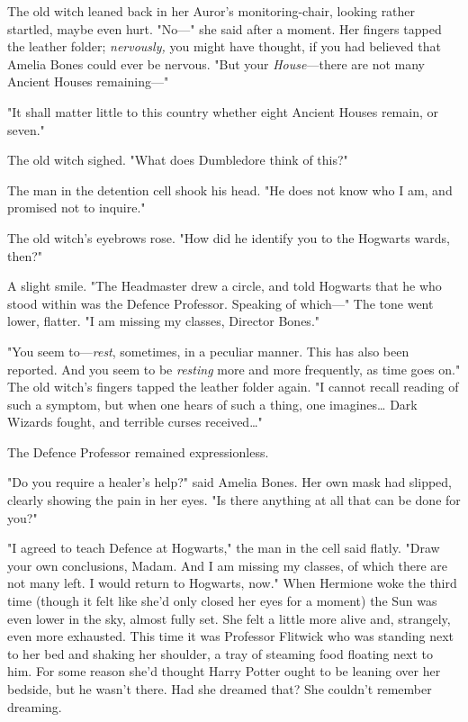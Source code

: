 The old witch leaned back in her Auror's monitoring-chair, looking rather
startled, maybe even hurt. "No---" she said after a moment. Her fingers tapped
the leather folder; \emph{nervously,} you might have thought, if you had
believed that Amelia Bones could ever be nervous. "But your
\emph{House}---there are not many Ancient Houses remaining---"

"It shall matter little to this country whether eight Ancient Houses remain, or
seven."

The old witch sighed. "What does Dumbledore think of this?"

The man in the detention cell shook his head. "He does not know who I am, and
promised not to inquire."

The old witch's eyebrows rose. "How did he identify you to the Hogwarts wards,
then?"

A slight smile. "The Headmaster drew a circle, and told Hogwarts that he who
stood within was the Defence Professor. Speaking of which---" The tone went
lower, flatter. "I am missing my classes, Director Bones."

"You seem to---\emph{rest}, sometimes, in a peculiar manner. This has also been
reported. And you seem to be \emph{resting} more and more frequently, as time
goes on." The old witch's fingers tapped the leather folder again. "I cannot
recall reading of such a symptom, but when one hears of such a thing, one
imagines{\ldots} Dark Wizards fought, and terrible curses received{\ldots}"

The Defence Professor remained expressionless.

"Do you require a healer's help?" said Amelia Bones. Her own mask had slipped,
clearly showing the pain in her eyes. "Is there anything at all that can be
done for you?"

"I agreed to teach Defence at Hogwarts," the man in the cell said flatly. "Draw
your own conclusions, Madam. And I am missing my classes, of which there are
not many left. I would return to Hogwarts, now."
\later
When Hermione woke the third time (though it felt like she'd only closed her
eyes for a moment) the Sun was even lower in the sky, almost fully set. She
felt a little more alive and, strangely, even more exhausted. This time it was
Professor Flitwick who was standing next to her bed and shaking her shoulder, a
tray of steaming food floating next to him. For some reason she'd thought Harry
Potter ought to be leaning over her bedside, but he wasn't there. Had she
dreamed that? She couldn't remember dreaming.


